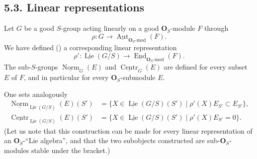 \subsection*{5.3. Linear representations}

Let \(G\) be a good \(S\)-group acting linearly on a good
\(\mathbf O_S\)-module \(F\) through
\[
 \rho:G\longrightarrow
 \underline{\operatorname{Aut}}_{\mathbf O_S\text{-}\mathrm{mod}}(F).
\]
We have defined () a corresponding linear representation
\[
 \rho':
 \underline{\operatorname{Lie}}(G/S)
 \longrightarrow
 \underline{\operatorname{End}}_{\mathbf O_S\text{-}\mathrm{mod}}(F).
\]
The sub-\(S\)-groups
\(\underline{\operatorname{Norm}}_G(E)\) and
\(\underline{\operatorname{Centr}}_G(E)\) are defined for every subset
\(E\) of \(F\), and in particular for every
\(\mathbf O_S\)-submodule \(E\).

%
One sets analogously
\[
\begin{split}
 \underline{\operatorname{Norm}}_{\underline{\operatorname{Lie}}(G/S)}
   (E)(S')
 &=\{X\in\underline{\operatorname{Lie}}(G/S)(S')
      \mid \rho'(X)E_{S'}\subset E_{S'}\},\\
 \underline{\operatorname{Centr}}_{\underline{\operatorname{Lie}}(G/S)}
   (E)(S')
 &=\{X\in\underline{\operatorname{Lie}}(G/S)(S')
      \mid \rho'(X)E_{S'}=0\}.
\end{split}
\]
(Let us note that this construction can be made for every linear
representation of an \(\mathbf O_S\)-``Lie algebra'', and that the two
subobjects constructed are sub-\(\mathbf O_S\)-modules stable under the
bracket.)


